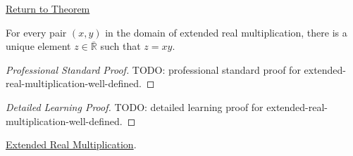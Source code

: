 \newpage
{}
\label{prf:extended-real-multiplication-well-defined}
\begin{remark*}[Return]
\hyperref[thm:extended-real-multiplication-well-defined]{Return to Theorem}
\end{remark*}
\begin{theorem*}
For every pair $(x,y)$ in the domain of extended real multiplication, there is
a unique element $z\in\overline{\mathbb{R}}$ such that $z=xy$.
\end{theorem*}
\begin{proof}[Professional Standard Proof]
\LRAProofBodyStart
TODO: professional standard proof for extended-real-multiplication-well-defined.
\end{proof}
\begin{proof}[Detailed Learning Proof]
\LRAProofBodyStart
TODO: detailed learning proof for extended-real-multiplication-well-defined.
\end{proof}
\begin{remark*}
\end{remark*}
\begin{dependencies}
\hyperref[def:extended-real-multiplication]{Extended Real Multiplication}.
\end{dependencies}
\clearpage
